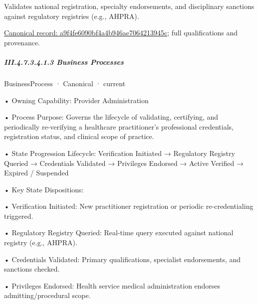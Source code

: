 Validates national registration, specialty endorsements, and disciplinary sanctions against regulatory registries (e.g., AHPRA).


{\footnotesize \href{../../../../continuum/business/business-function/a9f4fe6090bf4a4b946ae7064213945c.md}{Canonical record: a9f4fe6090bf4a4b946ae7064213945c}; full qualifications and provenance.}\par
\subparagraph*{III.4.7.3.4.1.3 Business Processes}
\label{navigation:III.4.7.3.4.1.3}

\label{navigation:III.4.7.3.4.1.3.1}

\label{element:32a3e1f948474d3aa77ca71bfa515f58}
{\small BusinessProcess · Canonical · current}\par

•
Owning Capability: Provider Administration



•
Process Purpose: Governs the lifecycle of validating, certifying, and periodically re-verifying a healthcare practitioner's professional credentials, registration status, and clinical scope of practice.



•
State Progression Lifecycle: Verification Initiated → Regulatory Registry Queried → Credentials Validated → Privileges Endorsed → Active Verified → Expired / Suspended



•
Key State Dispositions:



•
Verification Initiated: New practitioner registration or periodic re-credentialing triggered.



•
Regulatory Registry Queried: Real-time query executed against national registry (e.g., AHPRA).



•
Credentials Validated: Primary qualifications, specialist endorsements, and sanctions checked.



•
Privileges Endorsed: Health service medical administration endorses admitting/procedural scope.



